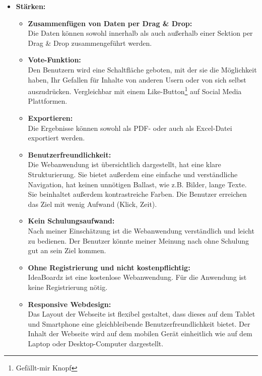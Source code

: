 \begin{itemize}
\item \textbf{Stärken:}
\begin{itemize}
\item \textbf{Zusammenfügen von Daten per Drag \& Drop:}\\
Die Daten können sowohl innerhalb als auch außerhalb einer Sektion per Drag \& Drop zusammengeführt werden.
\item \textbf{Vote-Funktion:}\\
Den Benutzern wird eine Schaltfläche geboten, mit der sie die Möglichkeit haben, Ihr Gefallen für Inhalte von anderen Usern oder von sich selbst auszudrücken. Vergleichbar mit einem Like-Button\footnote{Gefällt-mir Knopf} auf Social Media Plattformen.
\item \textbf{Exportieren:}\\
Die Ergebnisse können sowohl als PDF- oder auch als Excel-Datei exportiert werden.
\item \textbf{Benutzerfreundlichkeit:}\\
Die Webanwendung ist übersichtlich dargestellt, hat eine klare Strukturierung. Sie bietet außerdem eine einfache und verständliche Navigation, hat keinen unnötigen Ballast, wie z.B. Bilder, lange Texte. Sie beinhaltet außerdem kontrastreiche Farben. Die Benutzer erreichen das Ziel mit wenig Aufwand (Klick, Zeit).
\item \textbf{Kein Schulungsaufwand:}\\
Nach meiner Einschätzung ist die Webanwendung verständlich und leicht zu bedienen. Der Benutzer könnte meiner Meinung nach ohne Schulung gut an sein Ziel kommen.
\item \textbf{Ohne Registrierung und nicht kostenpflichtig:}\\
IdeaBoardz ist eine kostenlose Webanwendung. Für die Anwendung ist keine Registrierung nötig.
\item \textbf{Responsive Webdesign:}\\
Das Layout der Webseite ist flexibel gestaltet, dass dieses auf dem Tablet und Smartphone eine gleichbleibende Benutzerfreundlichkeit bietet. 
Der Inhalt der Webseite wird auf dem mobilen Gerät einheitlich wie auf dem Laptop oder Desktop-Computer dargestellt.
\end{itemize}
\end{itemize}

